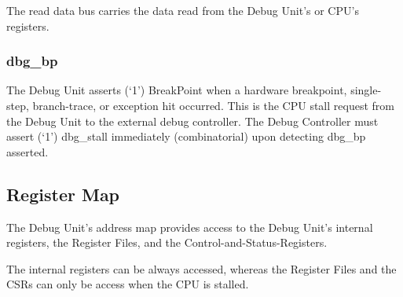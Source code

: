 The read data bus carries the data read from the Debug Unit's or CPU's
registers.

\subsubsection{dbg\_bp}\label{dbg_bp}

The Debug Unit asserts (`1') BreakPoint when a hardware breakpoint,
single-step, branch-trace, or exception hit occurred. This is the CPU
stall request from the Debug Unit to the external debug controller. The
Debug Controller must assert (`1') dbg\_stall immediately
(combinatorial) upon detecting dbg\_bp asserted.

\subsection{Register Map}\label{register-map}

The Debug Unit's address map provides access to the Debug Unit's
internal registers, the Register Files, and the
Control-and-Status-Registers.

The internal registers can be always accessed, whereas the Register
Files and the CSRs can only be access when the CPU is stalled.

